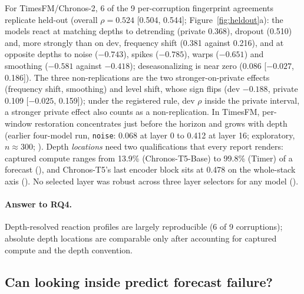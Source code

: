 For TimesFM/Chronos-2, 6 of the 9 per-corruption fingerprint agreements replicate held-out (overall $\rho=0.524$
[0.504, 0.544]; Figure~\ref{fig:heldout}a): the models react at matching depths to detrending (private 0.368), dropout
(0.510) and, more strongly than on dev, frequency shift (0.381 against 0.216), and at opposite depths to noise
($-0.743$), spikes ($-0.785$), warps ($-0.651$) and smoothing ($-0.581$ against $-0.418$); deseasonalizing is near zero
(0.086 [$-0.027$, 0.186]). The three non-replications are the two stronger-on-private effects (frequency shift,
smoothing) and level shift, whose sign flips (dev $-0.188$, private 0.109 [$-0.025$, 0.159]); under the registered rule,
dev $\rho$ inside the private interval, a stronger private effect also counts as a non-replication. In TimesFM,
per-window restoration concentrates just before the horizon and grows with depth (earlier four-model run,
\texttt{noise}: 0.068 at layer 0 to 0.412 at layer 16; exploratory, $n\approx300$; ). Depth \emph{locations} need two qualifications that every report renders: captured compute ranges from
13.9\% (Chronos-T5-Base) to 99.8\% (Timer) of a forecast (), and Chronos-T5's last encoder block sits at 0.478
on the whole-stack axis (). No selected layer was robust across three layer selectors for any model ().

\paragraph{Answer to RQ4.} Depth-resolved reaction profiles are largely reproducible (6 of 9 corruptions); absolute depth
locations are comparable only after accounting for captured compute and the depth convention.

\subsection{Can looking inside predict forecast failure?}
\label{sec:practical}

